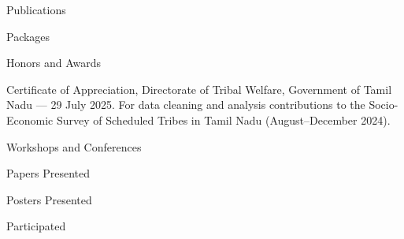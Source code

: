 \documentclass[
a4paper,
11pt]{resume}
\begin{document}
	\begin{rSection}[~\screenonly{\small \hlink{https://orcid.org/0009-0000-6180-5783}{\faOrcid}~\hlink{https://scholar.google.com/citations?user=Yj3yW6MAAAAJ}{\faGoogleScholar}}]{Publications}
		\printbibliography[keyword=pub,heading=empty
		,env=numbered %
		]
	\end{rSection}
	\begin{rSection}{Packages}
		\printbibliography[keyword=software, heading=empty
		,env=numbered %
		]
	\end{rSection}
			\begin{rSection}{Honors and Awards}
		\begin{rItemize}
			\item Certificate of Appreciation, Directorate of Tribal Welfare, Government of Tamil Nadu — 29 July 2025. For data cleaning and analysis contributions to the Socio-Economic Survey of Scheduled Tribes in Tamil Nadu (August--December 2024).
		\end{rItemize}
	\end{rSection}
		
	\begin{rSection}{Workshops and Conferences}
		\begin{rSubheading}{Papers Presented}
			\printbibliography[keyword=present,heading=empty
			,env=numbered %
			]
		\end{rSubheading}
		
		\begin{rSubheading}{Posters Presented}
			\printbibliography[keyword=poster,heading=empty
			,env=numbered %
			]
		\end{rSubheading}
		\begin{rSubheading}{Participated}
			\printbibliography[keyword=part,heading=empty
			,env=numbered %
			]
		\end{rSubheading}
	\end{rSection}
	\vfill
	\attachmentnote
	\label{cvlastpage}
\end{document}
